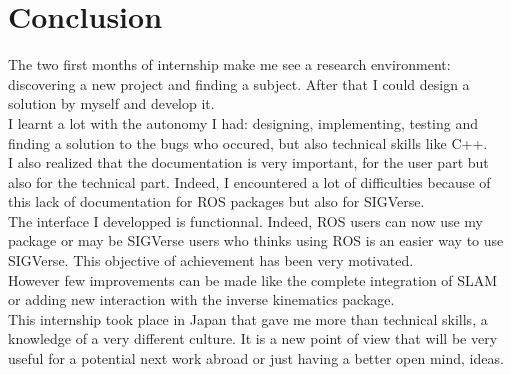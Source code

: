 \chapter{Conclusion}
\setlength{\parskip}{2.5ex plus .4ex minus .4ex}
The two first months of internship make me see a research environment: discovering a new project and finding a subject. After that I could design a solution by myself and develop it.\\

I learnt a lot with the autonomy I had: designing, implementing, testing and finding a solution to the bugs who occured, but also technical skills like C++.\\
I also realized that the documentation is very important, for the user part but also for the technical part. Indeed, I encountered a lot of difficulties because of this lack of documentation for ROS packages but also for SIGVerse.\\

The interface I developped is functionnal. Indeed, ROS users can now use my package or may be SIGVerse users who thinks using ROS is an easier way to use SIGVerse. This objective of achievement has been very motivated.\\
However few improvements can be made like the complete integration of SLAM or adding new interaction with the inverse kinematics package.\\

This internship took place in Japan that gave me more than technical skills, a knowledge of a very different culture. It is a new point of view that will be very useful for a potential next work abroad or just having a better open mind, ideas. 


